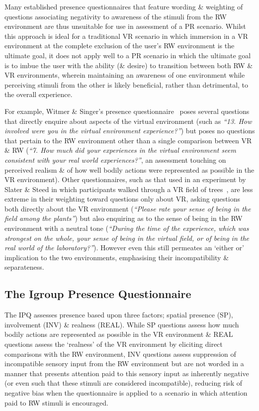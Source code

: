 Many established presence questionnaires that feature wording \& weighting of questions associating negativity to awareness of the stimuli from the RW environment are thus unsuitable for use in assessment of a PR scenario. Whilst this approach is ideal for a traditional VR scenario in which immersion in a VR environment at the complete exclusion of the user's RW environment is the ultimate goal, it does not apply well to a PR scenario in which the ultimate goal is to imbue the user with the ability (\& desire) to transition between both RW \& VR environments, wherein maintaining an awareness of one environment while perceiving stimuli from the other is likely beneficial, rather than detrimental, to the overall experience.

For example, Witmer \& Singer's presence questionnaire~\cite{Witmer1998} poses several questions that directly enquire about aspects of the virtual environment (such as \textit{``13. How involved were you in the virtual environment experience?''}) but poses no questions that pertain to the RW environment other than a single comparison between VR \& RW (\textit{``7. How much did your experiences in the virtual environment seem consistent with your real world experiences?''}, an assessment touching on perceived realism \& of how well bodily actions were represented as possible in the VR environment). Other questionnaires, such as that used in an experiment by Slater \& Steed in which participants walked through a VR field of trees~\cite{Slater1998}, are less extreme in their weighting toward questions only about VR, asking questions both directly about the VR environment (\textit{``Please rate your sense of being in the field among the plants''}) but also enquiring as to the sense of being in the RW environment with a neutral tone (\textit{``During the time of the experience, which was strongest on the whole, your sense of being in the virtual field, or of being in the real world of the laboratory?''}). However even this still permeates an `either or' implication to the two environments, emphasising their incompatibility \& separateness.


\subsection{The Igroup Presence Questionnaire}
\label{igroup-presence-questionnaire-explanation}
The IPQ assesses presence based upon three factors; spatial presence (SP), involvement (INV) \& realness (REAL). While SP questions assess how much bodily actions are represented as possible in the VR environment \& REAL questions assess the `realness' of the VR environment by eliciting direct comparisons with the RW environment, INV questions assess suppression of incompatible sensory input from the RW environment but are not worded in a manner that presents attention paid to this sensory input as inherently negative (or even such that these stimuli are considered incompatible), reducing risk of negative bias when the questionnaire is applied to a scenario in which attention paid to RW stimuli is encouraged.

